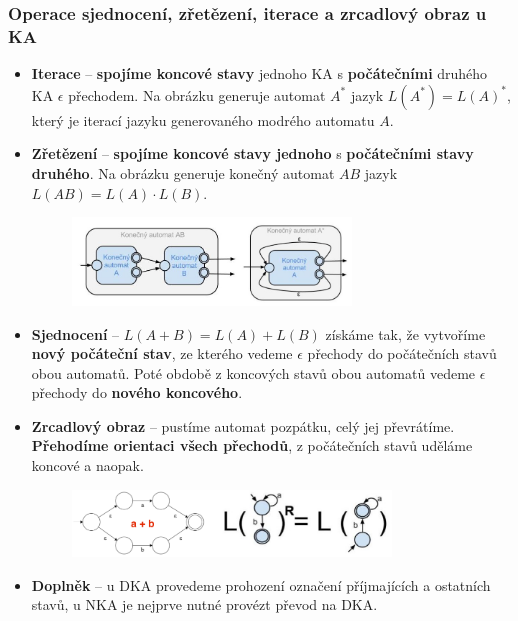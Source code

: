 \subsubsection{Operace sjednocení, zřetězení, iterace a zrcadlový obraz u KA}
\begin{itemize}
	\item \textbf{Iterace} -- \textbf{spojíme koncové stavy} jednoho KA s \textbf{počátečními} druhého KA $\epsilon$ přechodem. Na obrázku generuje automat $A^*$ jazyk $L(A^*) = L(A)^*$, který je iterací jazyku generovaného modrého automatu $A$.
	\item \textbf{Zřetězení} -- \textbf{spojíme koncové stavy jednoho} s \textbf{počátečními stavy druhého}. Na obrázku generuje konečný automat $AB$ jazyk $L(AB) = L(A) \cdot L(B)$.
	\begin{figure}[H]
		\centering
		\includegraphics[width=0.7\textwidth]{assets/ka_zret}
	\end{figure}
	\item \textbf{Sjednocení} -- $L(A + B) = L(A) + L(B)$ získáme tak, že vytvoříme \textbf{nový počáteční stav}, ze kterého vedeme $\epsilon$ přechody do počátečních stavů obou automatů. Poté obdobě z koncových stavů obou automatů vedeme $\epsilon$ přechody do \textbf{nového koncového}.
	\item \textbf{Zrcadlový obraz} -- pustíme automat pozpátku, celý jej převrátíme. \textbf{Přehodíme orientaci všech přechodů}, z počátečních stavů uděláme koncové a naopak.
	\begin{figure}[H]
		\centering
		\includegraphics[width=0.8\textwidth]{assets/ka_zrcd}
	\end{figure}
	\item \textbf{Doplněk} -- u DKA provedeme prohození označení příjmajících a ostatních stavů, u NKA je nejprve nutné provézt převod na DKA.
\end{itemize}

